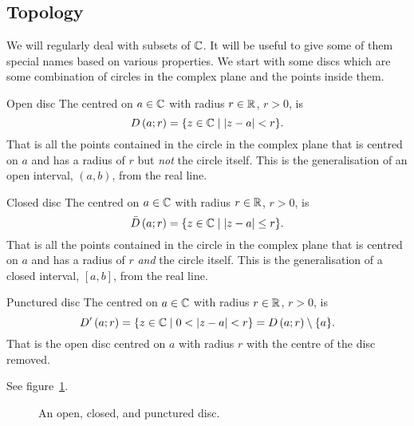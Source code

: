 \documentclass{article}
\newcommand{\st}{\mid}
\newcommand{\discOpen}[2]{D\left({#1}; {#2}\right)}
\newcommand{\discClosed}[2]{\bar{D}\left({#1}; {#2}\right)}
\newcommand{\discPunctured}[2]{D'\left({#1}; {#2}\right)}
\begin{document}
    \subsection{Topology}
    We will regularly deal with subsets of \(\mathbb{C}\).
    It will be useful to give some of them special names based on various properties.
    We start with some discs which are some combination of circles in the complex plane and the points inside them.
    \begin{definition}{Open disc}{}
        The  centred on \(a\in\mathbb{C}\) with radius \(r\in\mathbb{R}\), \(r > 0\), is
        \[\discOpen{a}{r} = \{z\in\complex \st \abs{z - a} < r\}.\]
        That is all the points contained in the circle in the complex plane that is centred on \(a\) and has a radius of \(r\) but \emph{not} the circle itself.
        This is the generalisation of an open interval, \((a, b)\), from the real line.
    \end{definition}
    \begin{definition}{Closed disc}{}
        The  centred on \(a\in\mathbb{C}\) with radius \(r\in\mathbb{R}\), \(r > 0\), is
        \[\discClosed{a}{r} = \{z\in\complex \st \abs{z - a} \le r\}.\]
        That is all the points contained in the circle in the complex plane that is centred on \(a\) and has a radius of \(r\) \emph{and} the circle itself.
        This is the generalisation of a closed interval, \([a, b]\), from the real line.
    \end{definition}
    \begin{definition}{Punctured disc}{}
        The  centred on \(a\in\mathbb{C}\) with radius \(r\in\mathbb{R}\), \(r > 0\), is
        \[\discPunctured{a}{r} = \{z\in\complex \st 0 < \abs{z - a} < r\} = \discOpen{a}{r}\setminus \{a\}.\]
        That is the open disc centred on \(a\) with radius \(r\) with the centre of the disc removed.
    \end{definition}
    See figure~\ref{fig:discs}.
    \begin{figure}[ht]
        \centering
        \tikzexternalenable
        \tikzexternaldisable
        \caption{An open, closed, and punctured disc.}
        \label{fig:discs}
    \end{figure}
    
\end{document}
